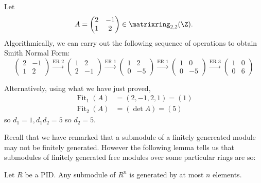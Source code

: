 \documentclass[a4paper]{article}
\DeclareMathOperator{\fit}{Fit}
\begin{document}
\begin{eg}
  Let
  \[
    A =
    \begin{pmatrix}
      2 & -1 \\
      1 & 2
    \end{pmatrix}
    \in \matrixring_{2, 2}(\Z).
  \]
  Algorithmically, we can carry out the following sequence of operations to obtain Smith Normal Form:
  \[
    \begin{pmatrix}
      2 & -1 \\
      1 & 2
    \end{pmatrix}
    \stackrel{\text{ER } 2}{\to}
    \begin{pmatrix}
      1 & 2 \\
      2 & -1
    \end{pmatrix}
    \stackrel{\text{ER } 1}{\to}
    \begin{pmatrix}
      1 & 2 \\
      0 & -5
    \end{pmatrix}
    \stackrel{\text{ER } 1}{\to}
    \begin{pmatrix}
      1 & 0 \\
      0 & -5
    \end{pmatrix}
    \stackrel{\text{ER } 3}{\to}
    \begin{pmatrix}
      1 & 0 \\
      0 & 6
    \end{pmatrix}
  \]

  Alternatively, using what we have just proved,
  \begin{align*}
    \fit_1(A) &= (2, -1, 2, 1) = (1) \\
    \fit_2(A) &= (\det A) = (5)
  \end{align*}
  so \(d_1 = 1, d_1d_2 = 5\) so \(d_2 = 5\).
\end{eg}

Recall that we have remarked that a submodule of a finitely genereated module may not be finitely generated. However the following lemma tells us that submodules of finitely generated free modules over some particular rings are so:

\begin{lemma}
  Let \(R\) be a PID. Any submodule of \(R^n\) is generated by at most \(n\) elements.
\end{lemma}
\end{document}

